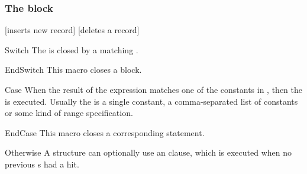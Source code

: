 \documentclass[a4paper, 11pt]{article}
\begin{document}
\subsubsection{The  block}

\begin{PDExample}
    \begin{algorithmic}
            [inserts new record]
            \EndCase
            [deletes a record]
            \EndCase
            \Otherwise
            \EndOtherwise
        \EndSwitch
    \end{algorithmic}
\end{PDExample}


\begin{Macrodef}{Switch}{}{}
    The  is closed by a matching .

    \BlockOptionsText
\end{Macrodef}

\begin{Macrodef}{EndSwitch}{}{}
    This macro closes a  block.

    \MacroOptionsText
\end{Macrodef}

\begin{Macrodef}{Case}{}{}
    When the result of the  expression matches one of the constants in , then the  is executed. Usually the  is a single constant, a comma-separated list of constants or some kind of range specification.

    \BlockOptionsText
\end{Macrodef}

\begin{Macrodef}{EndCase}{}{}
    This macro closes a corresponding  statement.

    \MacroOptionsText
\end{Macrodef}

\begin{Macrodef}{Otherwise}{}{}
    A  structure can optionally use an  clause, which is executed when no previous s had a hit.

    \BlockOptionsText
\end{Macrodef}
\end{document}
